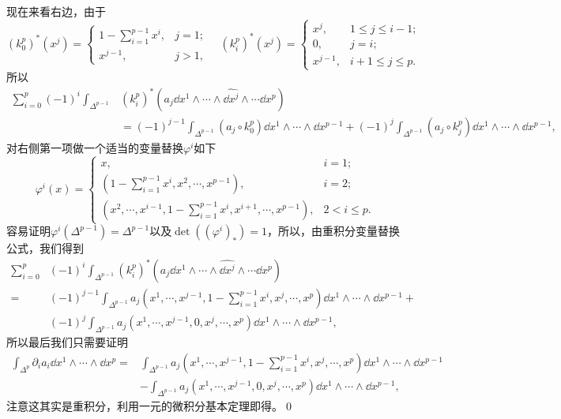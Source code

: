 \documentclass[9pt]{extbook}
\begin{document}
现在来看右边，由于
\[(k^p_0)^*(x^j)=
\begin{cases}
	1-\sum_{i=1}^{p-1}x^i,& j =1;\\
	x^{j-1},& j>1,
\end{cases}\quad
(k^p_i)^*(x^j)=
\begin{cases}
	x^j,& 1\leq j \leq i-1;\\
	0,& j=i;\\
	x^{j-1},& i+1\leq j \leq p.
\end{cases}
\]
所以
\[
\begin{split}
	\sum_{i=0}^p(-1)^i\int_{\Delta^{p-1}}& (k^p_i)^*(a_j\dd x^1\wedge\cdots\wedge\widehat{\dd x^j}\wedge\cdots \dd x^p)\\
	&=(-1)^{j-1}\int_{\Delta^{p-1}} (a_j\circ k^p_0)\dd x^1\wedge\cdots \wedge\dd x^{p-1}+(-1)^j\int_{\Delta^{p-1}} (a_j\circ k_j^p)\dd x^1\wedge\cdots \wedge\dd x^{p-1},
\end{split}
\]
对右侧第一项做一个适当的变量替换$\varphi^i$如下
\[
	\varphi^i(x)=
	\begin{cases}
	x,& i=1;\\
	(1-\sum_{i=1}^{p-1}x^i,x^2,\cdots,x^{p-1}),& i=2;\\
	(x^2,\cdots,x^{i-1},1-\sum_{i=1}^{p-1}x^i,x^{i+1},\cdots,x^{p-1}),& 2<i\leq p.
\end{cases}
\]
容易证明$\varphi^i(\Delta^{p-1})=\Delta^{p-1}$以及$\det ((\varphi^i)_*)=1$，所以，由重积分变量替换公式，我们得到
\[
\begin{split}
	\sum_{i=0}^p&(-1)^i\int_{\Delta^{p-1}} (k^p_i)^*(a_j\dd x^1\wedge\cdots\wedge\widehat{\dd x^j}\wedge\cdots \dd x^p)\\
	=&(-1)^{j-1}\int_{\Delta^{p-1}} a_j\left(x^1,\cdots,x^{j-1},1-\sum_{i=1}^{p-1}x^i,x^{j},\cdots,x^p\right)\dd x^1\wedge\cdots \wedge\dd x^{p-1}+\\
	&(-1)^{j}\int_{\Delta^{p-1}}a_j(x^1,\cdots,x^{j-1},0,x^{j},\cdots,x^p)\dd x^1\wedge\cdots \wedge\dd x^{p-1},
\end{split}
\]
所以最后我们只需要证明
\[
\begin{split}
	\int_{\Delta^{p}}\partial_i a_i\dd x^1\wedge\cdots \wedge\dd x^p=
	&\int_{\Delta^{p-1}} a_j\left(x^1,\cdots,x^{j-1},1-\sum_{i=1}^{p-1}x^i,x^{j},\cdots,x^p\right)\dd x^1\wedge\cdots \wedge\dd x^{p-1}\\
	&-\int_{\Delta^{p-1}}a_j(x^1,\cdots,x^{j-1},0,x^{j},\cdots,x^p)\dd x^1\wedge\cdots \wedge\dd x^{p-1},
\end{split}
\]
注意这其实是重积分，利用一元的微积分基本定理即得。\qed
\end{document}
